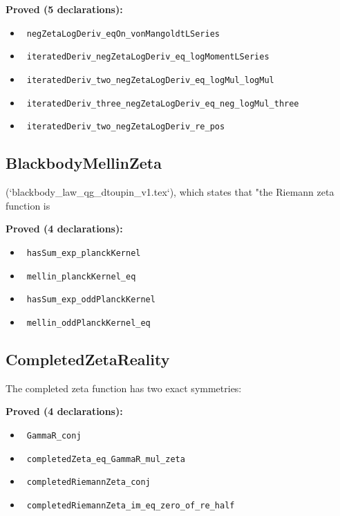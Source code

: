 \documentclass{report}
\theoremstyle{definition}
\begin{document}
\noindent\textbf{Proved (5 declarations):}
\begin{itemize}
  \item {}\leanok\ \texttt{negZetaLogDeriv\_eqOn\_vonMangoldtLSeries}
  \item {}\leanok\ \texttt{iteratedDeriv\_negZetaLogDeriv\_eq\_logMomentLSeries}
  \item {}\leanok\ \texttt{iteratedDeriv\_two\_negZetaLogDeriv\_eq\_logMul\_logMul}
  \item {}\leanok\ \texttt{iteratedDeriv\_three\_negZetaLogDeriv\_eq\_neg\_logMul\_three}
  \item {}\leanok\ \texttt{iteratedDeriv\_two\_negZetaLogDeriv\_re\_pos}
\end{itemize}

\subsection{BlackbodyMellinZeta}
(`blackbody\_law\_qg\_dtoupin\_v1.tex`), which states that "the Riemann zeta function is

\noindent\textbf{Proved (4 declarations):}
\begin{itemize}
  \item {}\leanok\ \texttt{hasSum\_exp\_planckKernel}
  \item {}\leanok\ \texttt{mellin\_planckKernel\_eq}
  \item {}\leanok\ \texttt{hasSum\_exp\_oddPlanckKernel}
  \item {}\leanok\ \texttt{mellin\_oddPlanckKernel\_eq}
\end{itemize}

\subsection{CompletedZetaReality}
The completed zeta function has two exact symmetries:

\noindent\textbf{Proved (4 declarations):}
\begin{itemize}
  \item {}\leanok\ \texttt{GammaR\_conj}
  \item {}\leanok\ \texttt{completedZeta\_eq\_GammaR\_mul\_zeta}
  \item {}\leanok\ \texttt{completedRiemannZeta\_conj}
  \item {}\leanok\ \texttt{completedRiemannZeta\_im\_eq\_zero\_of\_re\_half}
\end{itemize}
\end{document}
